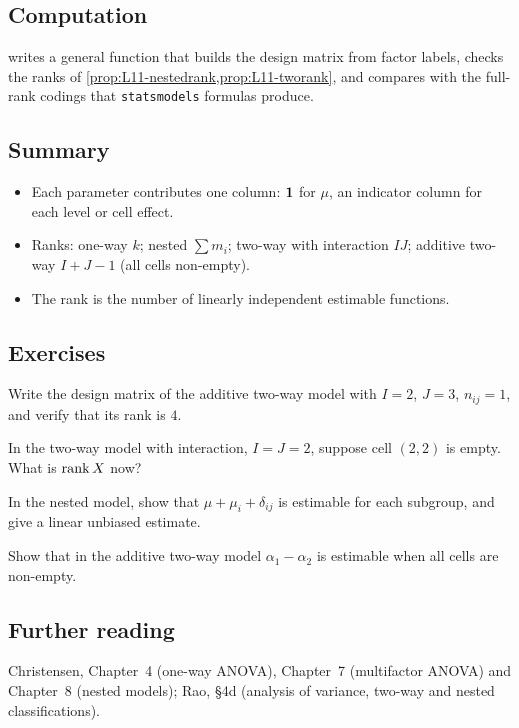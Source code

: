 \subsection{Computation}
 writes a general function that builds the design
matrix from factor labels, checks the ranks of \cref{prop:L11-nestedrank,prop:L11-tworank}, and
compares with the full-rank codings that \texttt{statsmodels} formulas produce.

\subsection{Summary}
\begin{itemize}
  \item Each parameter contributes one column: $\mathbf 1$ for $\mu$, an indicator column for each level or cell effect.
  \item Ranks: one-way $k$; nested $\sum m_i$; two-way with interaction $IJ$; additive two-way $I+J-1$ (all cells non-empty).
  \item The rank is the number of linearly independent estimable functions.
\end{itemize}

\subsection{Exercises}
\begin{problem}\label{prob:L11-1}
Write the design matrix of the additive two-way model with $I=2$, $J=3$, $n_{ij}=1$, and verify that its rank is $4$.
\end{problem}
\begin{problem}\label{prob:L11-2}
In the two-way model with interaction, $I=J=2$, suppose cell $(2,2)$ is empty. What is $\operatorname{rank} X$ now?
\end{problem}
\begin{problem}\label{prob:L11-3}
In the nested model, show that $\mu+\mu_i+\delta_{ij}$ is estimable for each subgroup, and give a linear unbiased estimate.
\end{problem}
\begin{problem}\label{prob:L11-4}
Show that in the additive two-way model $\alpha_1-\alpha_2$ is estimable when all cells are non-empty.
\end{problem}

\subsection{Further reading}
Christensen, Chapter~4 (one-way ANOVA), Chapter~7 (multifactor ANOVA) and Chapter~8 (nested
models); Rao, \S4d (analysis of variance, two-way and nested classifications).

